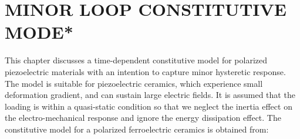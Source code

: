 %
%
%

% 
\raggedbottom 
\chapter{\uppercase {minor loop constitutive mode*}}
\label{section:minor_loop_constitutive_model_for_polarized_piezo_electric}
This chapter discusses a time-dependent constitutive model for polarized piezoelectric materials with an intention to capture minor hysteretic response.
The model is suitable for piezoelectric ceramics, which experience small deformation gradient, and can sustain large electric fields. 
It is assumed that the loading is within a quasi-static condition so that we neglect the inertia effect on the electro-mechanical response and ignore the energy dissipation effect. 
The constitutive model for a polarized ferroelectric ceramics is obtained from:


